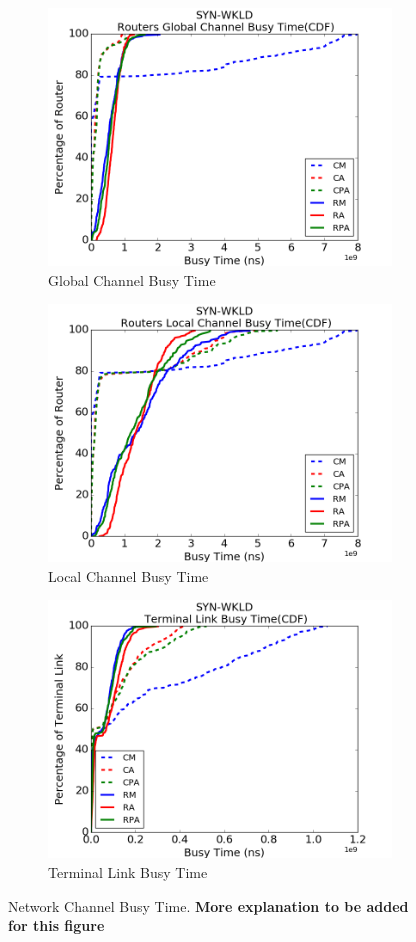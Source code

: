 \documentclass[conference,compsoc]{IEEEtran}
\begin{document}
\begin{figure}[t!]
    \centering   
    \begin{subfigure}[t]{0.32\textwidth}
        \centering
        \includegraphics[height=1.8 in]{syn-wkld/gc-btime}
        \caption{Global Channel Busy Time}
        \label{fig:synwkld-global-channel-stime}
    \end{subfigure}%
     \hspace{1em}%
    \begin{subfigure}[t]{0.32\textwidth}
        \centering
        \includegraphics[height=1.8 in]{syn-wkld/lc-btime}
        \caption{Local Channel Busy Time}
        \label{fig:synwkld-local-channel-stime}
    \end{subfigure}%
    \hspace{1em}%
    \begin{subfigure}[t]{0.32\textwidth}
        \centering
        \includegraphics[height=1.8 in]{syn-wkld/tl-btime}
        \caption{Terminal Link Busy Time}
        \label{fig:synwkld-terminal-link-stime}
    \end{subfigure}%
   \caption{Network Channel Busy Time. \textbf{More explanation to be added for this figure}}
   \label{fig:synwkld-network-stime}
\end{figure}
\end{document}
